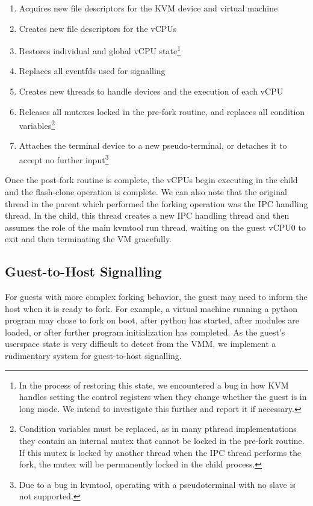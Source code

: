 \begin{enumerate}
\item Acquires new file descriptors for the KVM device and virtual machine
\item Creates new file descriptors for the vCPUs
\item Restores individual and global vCPU state\footnote{In the process of
restoring this state, we encountered a bug in how KVM handles setting the
control registers when they change whether the guest is in long mode. We intend
to investigate this further and report it if necessary.}
\item Replaces all eventfds used for signalling
\item Creates new threads to handle devices and the execution of each vCPU
\item Releases all mutexes locked in the pre-fork routine, and replaces all
condition variables\footnote{Condition variables must be replaced, as in many
pthread implementations they contain an internal mutex that cannot be locked in
the pre-fork routine. If this mutex is locked by another thread when the IPC
thread performs the fork, the mutex will be permanently locked in the child
process.}
\item Attaches the terminal device to a new pseudo-terminal, or detaches it to
accept no further input\footnote{Due to a bug in kvmtool, operating with a
pseudoterminal with no slave is not supported.}
\end{enumerate}

Once the post-fork routine is complete, the vCPUs begin executing in the child
and the flash-clone operation is complete. We can also note that the original
thread in the parent which performed the forking operation was the IPC handling
thread. In the child, this thread creates a new IPC handling thread and then
assumes the role of the main kvmtool run thread, waiting on the guest vCPU0 to
exit and then terminating the VM gracefully.

\subsection{Guest-to-Host Signalling}

For guests with more complex forking behavior, the guest may need to inform the
host when it is ready to fork. For example, a virtual machine running a python
program may chose to fork on boot, after python has started, after modules are
loaded, or after further program initialization has completed. As the guest's
userspace state is very difficult to detect from the VMM, we implement a
rudimentary system for guest-to-host signalling.

